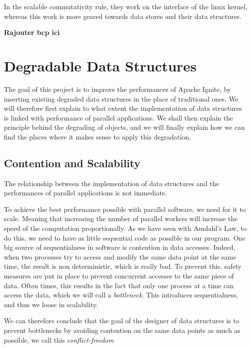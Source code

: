 \documentclass[conference]{IEEEtran}
\begin{document}
In the scalable commutativity rule, they work on the interface of the linux kernel, whereas this work is more geared towards data stores and their data structures.

\textbf{Rajouter bcp ici}


\bigbreak 

\section{Degradable Data Structures}
The goal of this project is to improve the performances of Apache Ignite, by inserting existing degraded data structures in the place of traditional ones. We will therefore first explain to what extent the implementation of data structures is linked with performance of parallel applications. We shall then explain the principle behind the degrading of objects, and we will finally explain how we can find the places where it makes sense to apply this degradation.

\subsection{Contention and Scalability} 
The relationship between the implementation of data structures and the performances of parallel applications is not immediate.

To achieve the best performance possible with parallel software, we need for it to scale. Meaning that increasing the number of parallel workers will increase the speed of the computation proportionally. As we have seen with Amdahl's Law, to do this, we need to have as little sequential code as possible in our program. One big source of sequentialness in software is contention in data accesses. Indeed, when two processes try to access and modify the same data point at the same time, the result is non deterministic, which is really bad. To prevent this, safety measures are put in place to prevent concurrent accesses to the same piece of data. Often times, this results in the fact that only one process at a time can access the data, which we will call a \textit{bottleneck}. This introduces sequentialness, and thus we loose in scalability.

We can therefore conclude that the goal of the designer of data structures is to prevent bottlenecks by avoiding contention on the same data points as much as possible, we call this \textit{conflict-freedom}
\end{document}
